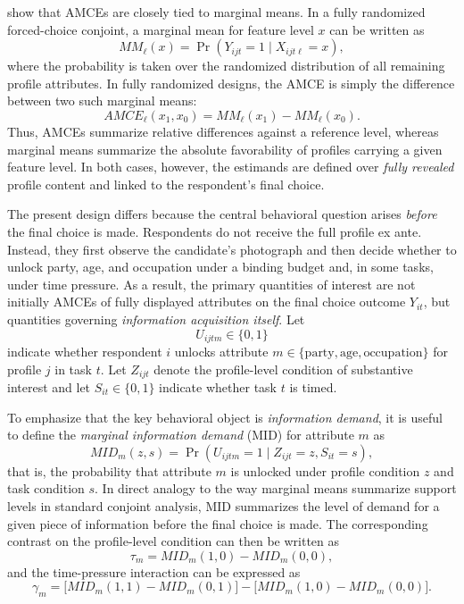 \documentclass[11pt]{article}
\begin{document}
\textcite{Leeper2020a} show that AMCEs are closely tied to marginal means. In a fully randomized forced-choice conjoint, a marginal mean for feature level $x$ can be written as
\[
MM_{\ell}(x) = \Pr(Y_{ijt}=1 \mid X_{ijt\ell}=x),
\]
where the probability is taken over the randomized distribution of all remaining profile attributes. In fully randomized designs, the AMCE is simply the difference between two such marginal means:
\[
AMCE_{\ell}(x_1,x_0) = MM_{\ell}(x_1) - MM_{\ell}(x_0).
\]
Thus, AMCEs summarize relative differences against a reference level, whereas marginal means summarize the absolute favorability of profiles carrying a given feature level. In both cases, however, the estimands are defined over \emph{fully revealed} profile content and linked to the respondent's final choice.

The present design differs because the central behavioral question arises \emph{before} the final choice is made. Respondents do not receive the full profile ex ante. Instead, they first observe the candidate's photograph and then decide whether to unlock party, age, and occupation under a binding budget and, in some tasks, under time pressure. As a result, the primary quantities of interest are not initially AMCEs of fully displayed attributes on the final choice outcome $Y_{it}$, but quantities governing \emph{information acquisition itself}. Let
\[
U_{ijtm} \in \{0,1\}
\]
indicate whether respondent $i$ unlocks attribute $m \in \{\text{party},\text{age},\text{occupation}\}$ for profile $j$ in task $t$. Let $Z_{ijt}$ denote the profile-level condition of substantive interest and let $S_{it} \in \{0,1\}$ indicate whether task $t$ is timed.

To emphasize that the key behavioral object is \emph{information demand}, it is useful to define the \emph{marginal information demand} (MID) for attribute $m$ as
\[
MID_m(z,s) = \Pr(U_{ijtm}=1 \mid Z_{ijt}=z, S_{it}=s),
\]
that is, the probability that attribute $m$ is unlocked under profile condition $z$ and task condition $s$. In direct analogy to the way marginal means summarize support levels in standard conjoint analysis, MID summarizes the level of demand for a given piece of information before the final choice is made. The corresponding contrast on the profile-level condition can then be written as
\[
\tau_m = MID_m(1,0) - MID_m(0,0),
\]
and the time-pressure interaction can be expressed as
\[
\gamma_m =
\bigl[MID_m(1,1)-MID_m(0,1)\bigr]
-
\bigl[MID_m(1,0)-MID_m(0,0)\bigr].
\]
\end{document}
